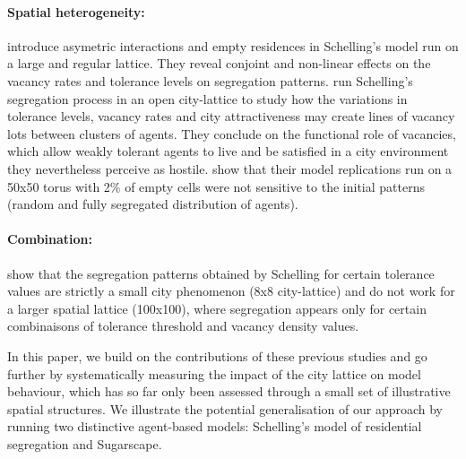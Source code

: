 \documentclass[Afour,sageh,times]{sagej}
\begin{document}
\paragraph{Spatial heterogeneity:} \citet{StaufferSolomon2007} introduce asymetric interactions and empty residences in Schelling's model run on a large and regular lattice. They reveal conjoint and non-linear effects on the vacancy rates and tolerance levels on segregation patterns. \citet{Gauvinetal2010} run Schelling's segregation process in an open city-lattice to study how the variations in tolerance levels, vacancy rates and city attractiveness may create lines of vacancy lots between clusters of agents. They conclude on the functional role of vacancies, which allow weakly tolerant agents to live and be satisfied in a city environment they nevertheless perceive as hostile. \citet{HatnaBenenson2012} show that their model replications run on a 50x50 torus with 2\% of empty cells were not sensitive to the initial patterns (random and fully segregated distribution of agents).

\paragraph{Combination:} \citet{Singhetal2009} show that the segregation patterns obtained by Schelling for certain tolerance values are strictly a small city phenomenon (8x8 city-lattice) and do not work for a larger spatial lattice (100x100), where segregation appears only for certain combinaisons of tolerance threshold and vacancy density values. 



In this paper, we build on the contributions of these previous studies and go further by systematically measuring the impact of the city lattice on model behaviour, which has so far only been assessed through a small set of illustrative spatial structures. We illustrate the potential generalisation of our approach by running two distinctive agent-based models: Schelling's model of residential segregation and Sugarscape.
\end{document}
